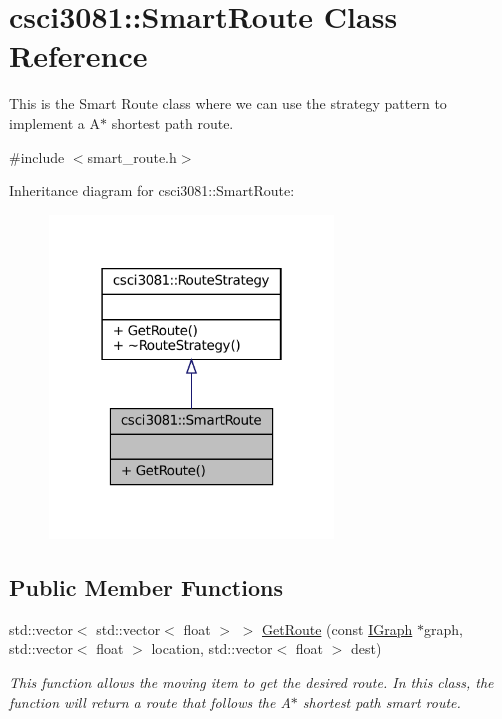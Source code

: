 \hypertarget{classcsci3081_1_1SmartRoute}{}\section{csci3081\+:\+:Smart\+Route Class Reference}
\label{classcsci3081_1_1SmartRoute}


This is the Smart Route class where we can use the strategy pattern to implement a A$\ast$ shortest path route.  




{\ttfamily \#include $<$smart\+\_\+route.\+h$>$}



Inheritance diagram for csci3081\+:\+:Smart\+Route\+:
\nopagebreak
\begin{figure}[H]
\begin{center}
\leavevmode
\includegraphics[width=214pt]{classcsci3081_1_1SmartRoute__inherit__graph}
\end{center}
\end{figure}
\subsection*{Public Member Functions}
\begin{DoxyCompactItemize}
\item 
std\+::vector$<$ std\+::vector$<$ float $>$ $>$ \hyperlink{classcsci3081_1_1SmartRoute_a166304ad52fe67131f4540577e3d863d}{Get\+Route} (const \hyperlink{classentity__project_1_1IGraph}{I\+Graph} $\ast$graph, std\+::vector$<$ float $>$ location, std\+::vector$<$ float $>$ dest)
\begin{DoxyCompactList}\small\item\em This function allows the moving item to get the desired route. In this class, the function will return a route that follows the A$\ast$ shortest path smart route. \end{DoxyCompactList}\end{DoxyCompactItemize}


